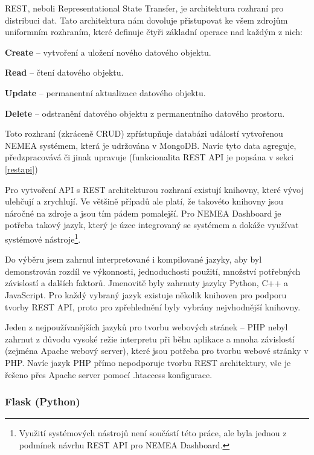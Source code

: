 REST, neboli Representational State Transfer, je architektura rozhraní pro distribuci dat. Tato architektura nám dovoluje přistupovat ke všem zdrojům uniformním rozhraním, které definuje čtyři základní operace nad každým z nich:

\begin{description}
    \item {\bf Create} -- vytvoření a uložení nového datového objektu.
    \item {\bf Read} -- čtení datového objektu.
    \item {\bf Update} -- permanentní aktualizace datového objektu.
    \item {\bf Delete} -- odstranění datového objektu z permanentního datového prostoru.
\end{description}

Toto rozhraní (zkráceně CRUD) zpřístupňuje databázi událostí vytvořenou NEMEA systémem, která je udržována v MongoDB. Navíc tyto data agreguje, předzpracovává či jinak upravuje (funkcionalita REST API je popsána v sekci \ref{restapi})

Pro vytvoření API s REST architekturou rozhraní existují knihovny, které vývoj ulehčují a zrychlují. Ve většině případů ale platí, že takovéto knihovny jsou náročné na zdroje a jsou tím pádem pomalejší. Pro NEMEA Dashboard je potřeba takový jazyk, který je úzce integrovaný se systémem a dokáže využívat systémové nástroje\footnote{Využití systémových nástrojů není součástí této práce, ale byla jednou z podmínek návrhu REST API pro NEMEA Dashboard.}.

Do výběru jsem zahrnul interpretované i kompilované jazyky, aby byl demonstrován rozdíl ve výkonnosti, jednoduchosti použití, množství potřebných závislostí a dalších faktorů. Jmenovitě byly zahrnuty jazyky Python, C++ a JavaScript. Pro každý vybraný jazyk existuje několik knihoven pro podporu tvorby REST API, proto pro zpřehlednění byly vybrány nejvhodnější knihovny.

Jeden z nejpoužívanějších jazyků pro tvorbu webových stránek -- PHP nebyl zahrnut z důvodu vysoké režie interpretu při běhu aplikace a mnoha závislostí (zejména Apache webový server), které jsou potřeba pro tvorbu webové stránky v PHP. Navíc jazyk PHP přímo nepodporuje tvorbu REST architektury, vše je řešeno přes Apache server pomocí .htaccess konfigurace.

\subsubsection*{Flask (Python)}

